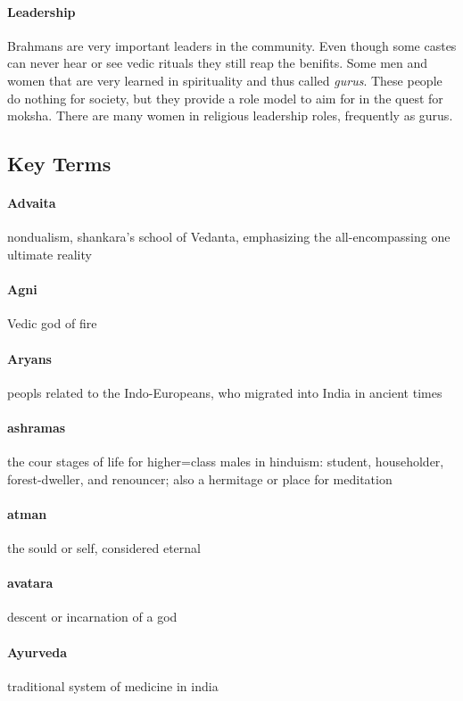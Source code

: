 \documentclass{article}
\begin{document}
\paragraph{Leadership}
\label{par:leadership}
Brahmans are very important leaders in the community. Even though some castes can never hear or see vedic rituals they still reap the benifits. Some men and women that are very learned in spirituality and thus called \emph{gurus}. These people do nothing for society, but they provide a role model to aim for in the quest for moksha. There are many women in religious leadership roles, frequently as gurus.


\subsection{Key Terms}
\label{sub:key_terms}
\paragraph{Advaita}
\label{par:advaita}
nondualism, shankara's school of Vedanta, emphasizing the all-encompassing one ultimate reality
\paragraph{Agni}
\label{par:agni}
Vedic god of fire
\paragraph{Aryans}
\label{par:aryans}
peopls related to the Indo-Europeans, who migrated into India in ancient times
\paragraph{ashramas}
\label{par:ashramas}
the cour stages of life for higher=class males in hinduism: student, householder, forest-dweller, and renouncer; also a hermitage or place for meditation
\paragraph{atman}
\label{par:atman}
the sould or self, considered eternal
\paragraph{avatara}
\label{par:avatara}
descent or incarnation of a god
\paragraph{Ayurveda}
\label{par:ayurveda}
traditional system of medicine in india
\end{document}
